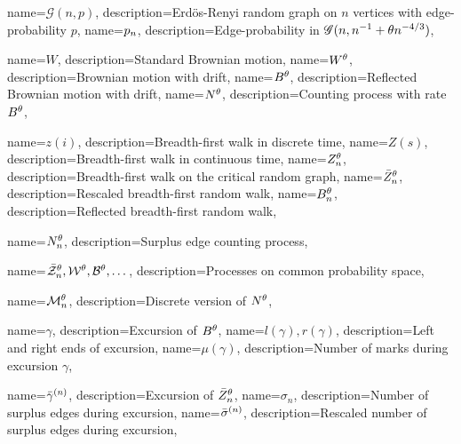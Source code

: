 
\usepackage[nopostdot, nonumberlist, toc, style = super]{glossaries}
\makenoidxglossaries 


{
	name={$\mathscr{G}(n,p)$},
	description={Erd\"os-Renyi random graph on $n$ vertices with edge-probability $p$, \pageref{I: gnt}}
}
{
	name={$p_n$},
	description={Edge-probability in $\mathscr{G}(n, n^{-1} + \theta n^{-4/3})$, \pageref{I: pp}}
}



{
	name={$W$},
	description={Standard Brownian motion, \pageref{I: bm}}
}
{
	name={$W^{\theta}$},
	description={Brownian motion with drift, \pageref{D: Wt}}
}
{
	name={$B^{\theta}$},
	description={Reflected Brownian motion with drift, \pageref{D: Bt}}
}
{
name={$N^{\theta}$},
description={Counting process with rate $B^{\theta}$, \pageref{I: nt}}
}

{
	name={$z(i)$},
	description={Breadth-first walk in discrete time, \pageref{E: def bf-walk z}}
}
{
	name={$Z(s)$},
	description={Breadth-first walk in continuous time, \pageref{E: def Z}}
}
{
	name={$Z_n^{\theta}$},
	description={Breadth-first walk on the critical random graph, \pageref{D: znt}}
}
{
	name={$\bar{Z}^{\theta}_n$},
	description={Rescaled breadth-first random walk, \pageref{T: Z -> W}}
}
{
	name={$B_n^{\theta}$},
	description={Reflected breadth-first random walk, \pageref{D: zminz}}
}

{
name={$N_n^{\theta}$},
description={Surplus edge counting process, \pageref{I: nnt}}
}

{
name={$\bar{\mathcal{Z}}^{\theta}_n, \mathcal{W}^{\theta}, \mathcal{B}^{\theta}, \dots$},
description={Processes on common probability space, \pageref{I: alt processes}}
}

{
name={$\mathcal{M}_n^{\theta}$},
description={Discrete version of $N^{\theta}$, \pageref{D: Ndis}}
}



{
	name={$\gamma$},
	description={Excursion of $B^{\theta}$, \pageref{I: gamma}}
}
{
name={$l(\gamma), r(\gamma)$},
description={Left and right ends of excursion, \pageref{I: rgammalgamma}}
}
{
name={$\mu(\gamma)$},
description={Number of marks during excursion $\gamma$, \pageref{I: mugamma}}
}

{
name={$\bar{\gamma}^{(n)}$},
description={Excursion of $\bar{Z}^{\theta}_n$, \pageref{L: sum rgamman}}
}
{
name={$\sigma_n$},
description={Number of surplus edges during excursion, \pageref{T: Main}}
}
{
name={$\bar{\sigma}^{(n)}$},
description={Rescaled number of surplus edges during excursion, \pageref{E: def Yn}}
}

